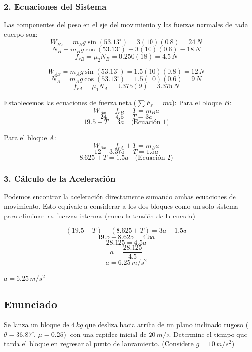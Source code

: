 \documentclass[12pt, a4paper]{article}
\begin{document}
\subsubsection*{2. Ecuaciones del Sistema}
Las componentes del peso en el eje del movimiento y las fuerzas normales de cada cuerpo son:
$$ W_{Bx} = m_B g \sin(53.13^\circ) = 3(10)(0.8) = 24 \, \si{N} $$
$$ N_B = m_B g \cos(53.13^\circ) = 3(10)(0.6) = 18 \, \si{N} $$
$$ f_{rB} = \mu_2 N_B = 0.250(18) = 4.5 \, \si{N} $$

$$ W_{Ax} = m_A g \sin(53.13^\circ) = 1.5(10)(0.8) = 12 \, \si{N} $$
$$ N_A = m_A g \cos(53.13^\circ) = 1.5(10)(0.6) = 9 \, \si{N} $$
$$ f_{rA} = \mu_1 N_A = 0.375(9) = 3.375 \, \si{N} $$

Establecemos las ecuaciones de fuerza neta ($\sum F_x = m a$):
Para el bloque $B$: 
$$ W_{Bx} - f_{rB} - T = m_B a $$
$$ 24 - 4.5 - T = 3a $$
$$ 19.5 - T = 3a \quad \text{(Ecuación 1)} $$

Para el bloque $A$: 
$$ W_{Ax} - f_{rA} + T = m_A a $$
$$ 12 - 3.375 + T = 1.5a $$
$$ 8.625 + T = 1.5a \quad \text{(Ecuación 2)} $$

\subsubsection*{3. Cálculo de la Aceleración}
Podemos encontrar la aceleración directamente sumando ambas ecuaciones de movimiento. Esto equivale a considerar a los dos bloques como un solo sistema para eliminar las fuerzas internas (como la tensión de la cuerda).

$$ (19.5 - T) + (8.625 + T) = 3a + 1.5a $$
$$ 19.5 + 8.625 = 4.5 a $$
$$ 28.125 = 4.5 a $$
$$ a = \frac{28.125}{4.5} $$
$$ a = 6.25 \, \si{m/s^2} $$

\begin{tcolorbox}[colback=green!5!white, colframe=green!50!black, title=Respuesta Final]
\centering \Large $a = 6.25 \, \si{m/s^2}$
\end{tcolorbox}

\newpage

\subsection*{Enunciado}
Se lanza un bloque de $4 \, \si{kg}$ que desliza hacia arriba de un plano inclinado rugoso ($\theta = 36.87^\circ$, $\mu = 0.25$), con una rapidez inicial de $20 \, \si{m/s}$. Determine el tiempo que tarda el bloque en regresar al punto de lanzamiento. (Considere $g = 10 \, \si{m/s^2}$).
\end{document}
